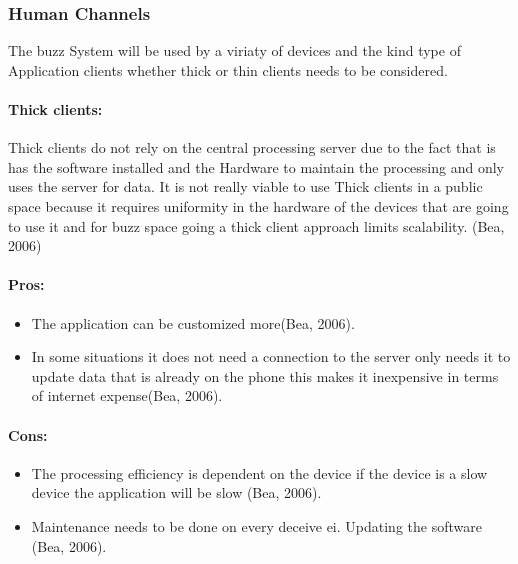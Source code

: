 
\subsubsection{Human Channels}
\begin{description}
\item \hspace{4ex}
 The buzz System will be used by a viriaty of devices and the kind type of 
 Application clients whether thick or thin clients needs to be considered.
\end{description}


\paragraph{Thick clients: } 
\begin{description}
 \item \hspace{4ex} 
Thick clients do not rely on the central processing server due to the fact that is has the software installed and the Hardware to maintain the processing and only uses the server for data.
  It is not really viable to use Thick clients in a public space because it requires uniformity in the hardware of the devices that are going to use it and for buzz space going a thick client approach limits scalability. (Bea, 2006)
\end{description}

\paragraph{Pros: } 
 \begin{itemize}	
		\item The application can be customized more(Bea, 2006).
                      \item In some situations it does not need a connection to the server only needs it to update data that is already on the phone this makes it inexpensive in terms of internet expense(Bea, 2006).
	\end{itemize}
\paragraph{Cons: } 
 \begin{itemize}	
		\item The processing efficiency is dependent on the device if the device is a slow device the application will be slow (Bea, 2006).
                      \item 	Maintenance needs to be done on every deceive ei. Updating the software (Bea, 2006).
	\end{itemize}



